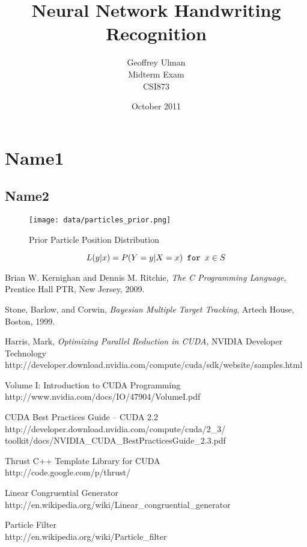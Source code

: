 \documentclass{article}
\begin{document}
\title{Neural Network Handwriting Recognition}
\author{Geoffrey Ulman\\
        Midterm Exam\\
        CSI873}
\date{October 2011}
\maketitle

\tableofcontents

\section{Name1}\label{Name1}

\subsection{Name2}\label{Name2}

\begin{figure}
\centering
\texttt{[image: data/particles\_prior.png]}
\caption{Prior Particle Position Distribution}
\label{prior}
\end{figure}

\begin{equation}\label{lfunc1}
L(y|x) = P( Y=y | X=x ) \verb! for ! x \in S
\end{equation}

\begin{thebibliography}{9}

  Brian W. Kernighan and Dennis M. Ritchie,
  \emph{The C Programming Language},
  Prentice Hall PTR, New Jersey,
  2009.

  Stone, Barlow, and Corwin,
  \emph{Bayesian Multiple Target Tracking},
  Artech House, Boston,
  1999.

   Harris, Mark,
   \emph{Optimizing Parallel Reduction in CUDA},
   NVIDIA Developer Technology \\
   http://developer.download.nvidia.com/compute/cuda/sdk/website/samples.html

   Volume I: Introduction to CUDA Programming \\
   http://www.nvidia.com/docs/IO/47904/VolumeI.pdf

   CUDA Best Practices Guide -- CUDA 2.2\\
   http://developer.download.nvidia.com/compute/cuda/2\_3/\\
   toolkit/docs/NVIDIA\_CUDA\_BestPracticesGuide\_2.3.pdf

   Thrust C++ Template Library for CUDA \\
   http://code.google.com/p/thrust/

   Linear Congruential Generator \\
   http://en.wikipedia.org/wiki/Linear\_congruential\_generator

   Particle Filter \\
   http://en.wikipedia.org/wiki/Particle\_filter

\end{thebibliography}
\end{document}
